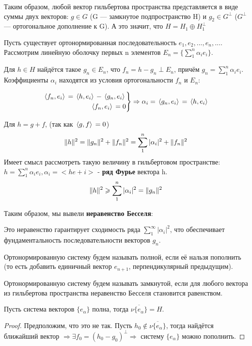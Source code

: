 	Таким образом, любой вектор гильбертова пространства представляется в виде суммы двух векторов:
	$g \in G$ (G --- замкнутое подпространство H) и $g_2 \in G^\perp$ ($G^\perp$ --- ортогональное дополнение к G).
	А это значит, что $H = H_1 \oplus H_1^\perp$
	
	Пусть существует ортонормированная последовательность $e_1, e_2, ..., e_n, ...$. Рассмотрим линейную оболочку первых n элементов $E_n = \{ \sum_1^n \alpha_i e_i \}$.

	Для $h \in H$ найдётся такое $g_n \in E_n$, что $f_n = h - g_n \perp E_n$, причём $g_n = \sum_1^n \alpha_i e_i$. Коэффициенты $\alpha_i$ находятся из условия ортогональности $f_n$ и $E_n$:

    $$
        \left.
        \begin{aligned}
            \, \langle f_n, e_i \rangle \, = \, \langle h, e_i \rangle \, - \, \langle g_n, e_i \rangle \, \\
            \, \langle f_n, e_i \rangle \, = 0
        \end{aligned}
        \right\} \Rightarrow \alpha_i = \, \langle g_n, e_i \rangle \, = \, \langle h, e_i \rangle \,
    $$

	Для $h = g + f$, (так как $\, \langle g, f \rangle \, = 0$)
	$$ \| h \|^2 = \| g_n \|^2 + \| f_n \|^2 = \sum_1^n |\alpha_i|^2 + \| f_n \|^2$$
	Имеет смысл рассмотреть такую величину в гильбертовом пространстве: $h = \sum_1^n \alpha_i e_i, \alpha_i = <h e+i>$ -
	\textbf{ряд Фурье} вектора h.
	$$ \| h \|^2 \geqslant \sum_1^n |\alpha_i|^2 = \| g_n \|^2 $$

	
	Таким образом, мы вывели \textbf{неравенство Бесселя}:

	Это неравенство гарантирует сходимость ряда $\sum_1^{\infty} |\alpha_i|^2$, что обеспечивает фундаментальность 
	последовательности векторов $g_n$.
	
	\begin{defi}
		Ортонормированную систему будем называть полной, если её нальзя пополнить (то есть добавить единичный вектор $e_{n+1}$, 
		перпендикулярный предыдущим).
	\end{defi}
	\begin{defi}
		Ортонормированную систему будем называть замкнутой, если для любого вектора из гильбертова пространства неравенство Бесселя
		становится равенством.
	\end{defi}
	
	\begin{state}
		Пусть система векторов $\{ e_\alpha \}$ полна, тогда $\overline{ \nu \{ e_\alpha \} } = H$.
	\end{state}
	\begin{proof}
		Предположим, что это не так. Пусть $h_0 \notin \overline{ \nu \{ e_\alpha \} }$, тогда найдётся ближайший вектор $\Rightarrow 
		\exists f_0 	= (h_0 - g_0)^\perp	\Rightarrow$ систему $\{ e_{\alpha} \}$ можно пополнить.
	\end{proof}
	
